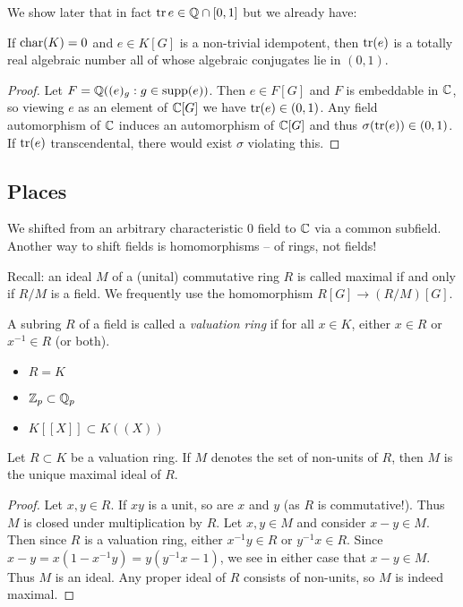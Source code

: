 We show later that in fact $\operatorname{tr} e \in \mathbb{Q} \cap [0, 1]$ but we already have:
\begin{corollary}
    If $\mathrm{char}(K) = 0$ and $e \in K[G]$ is a non-trivial idempotent, then $\operatorname{tr}(e)$ is a totally real algebraic number all of whose algebraic conjugates lie in $(0, 1)$.
\end{corollary}

\begin{proof}
    Let $F = \mathbb{Q}((e)_g : g \in \operatorname{supp}(e))$.
    Then $e \in F[G]$ and $F$ is embeddable in $\mathbb{C}$, so viewing $e$ as an element of $\mathbb{C}[G]$ we have $\operatorname{tr}(e) \in (0, 1)$.
    Any field automorphism of $\mathbb{C}$ induces an automorphism of $\mathbb{C}[G]$ and thus $\sigma(\operatorname{tr}(e)) \in (0, 1)$.
    If $\operatorname{tr}(e)$ transcendental, there would exist $\sigma$ violating this.
\end{proof}

\subsection*{Places}

We shifted from an arbitrary characteristic $0$ field to $\mathbb{C}$ via a common subfield.
Another way to shift fields is homomorphisms -- of rings, not fields!

Recall: an ideal $M$ of a (unital) commutative ring $R$ is called maximal if and only if $R / M$ is a field.
We frequently use the homomorphism $R[G] \to (R / M)[G]$.

\begin{definition}
    A subring $R$ of a field is called a \emph{valuation ring} if for all $x \in K$, either $x \in R$ or $x^{-1} \in R$ (or both).
\end{definition}

\begin{example}
    \begin{itemize}
        \item $R = K$
        \item $\mathbb{Z}_p \subset \mathbb{Q}_p$
        \item $K[[X]] \subset K((X))$
    \end{itemize}
\end{example}

\begin{lemma}
    Let $R \subset K$ be a valuation ring.
    If $M$ denotes the set of non-units of $R$, then $M$ is the unique maximal ideal of $R$.
\end{lemma}

\begin{proof}
    Let $x, y \in R$.
    If $xy$ is a unit, so are $x$ and $y$ (as $R$ is commutative!).
    Thus $M$ is closed under multiplication by $R$.
    Let $x, y \in M$ and consider $x - y \in M$.
    Then since $R$ is a valuation ring, either $x^{-1} y \in R$ or $y^{-1} x \in R$.
    Since $x - y = x(1 - x^{-1}y) = y(y^{-1} x - 1)$, we see in either case that $x - y \in M$.
    Thus $M$ is an ideal.
    Any proper ideal of $R$ consists of non-units, so $M$ is indeed maximal.
\end{proof}

